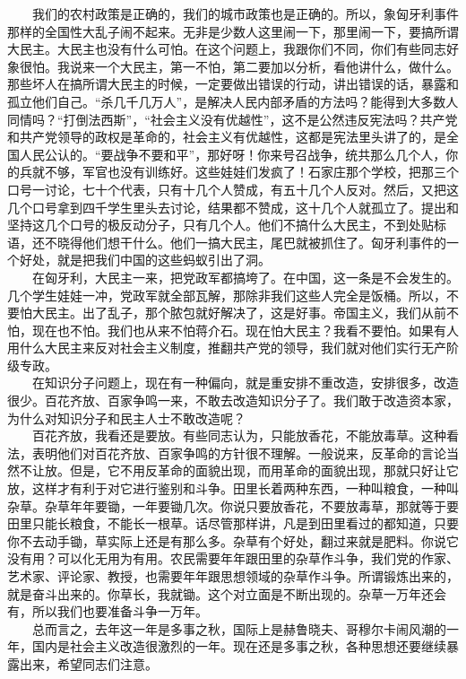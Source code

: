 \documentclass[cn,11pt,chinese]{elegantbook}
\begin{document}
　　我们的农村政策是正确的，我们的城市政策也是正确的。所以，象匈牙利事件那样的全国性大乱子闹不起来。无非是少数人这里闹一下，那里闹一下，要搞所谓大民主。大民主也没有什么可怕。在这个问题上，我跟你们不同，你们有些同志好象很怕。我说来一个大民主，第一不怕，第二要加以分析，看他讲什么，做什么。那些坏人在搞所谓大民主的时候，一定要做出错误的行动，讲出错误的话，暴露和孤立他们自己。“杀几千几万人”，是解决人民内部矛盾的方法吗？能得到大多数人同情吗？“打倒法西斯”，“社会主义没有优越性”，这不是公然违反宪法吗？共产党和共产党领导的政权是革命的，社会主义有优越性，这都是宪法里头讲了的，是全国人民公认的。“要战争不要和平”，那好呀！你来号召战争，统共那么几个人，你的兵就不够，军官也没有训练好。这些娃娃们发疯了！石家庄那个学校，把那三个口号一讨论，七十个代表，只有十几个人赞成，有五十几个人反对。然后，又把这几个口号拿到四千学生里头去讨论，结果都不赞成，这十几个人就孤立了。提出和坚持这几个口号的极反动分子，只有几个人。他们不搞什么大民主，不到处贴标语，还不晓得他们想干什么。他们一搞大民主，尾巴就被抓住了。匈牙利事件的一个好处，就是把我们中国的这些蚂蚁引出了洞。\\
　　在匈牙利，大民主一来，把党政军都搞垮了。在中国，这一条是不会发生的。几个学生娃娃一冲，党政军就全部瓦解，那除非我们这些人完全是饭桶。所以，不要怕大民主。出了乱子，那个脓包就好解决了，这是好事。帝国主义，我们从前不怕，现在也不怕。我们也从来不怕蒋介石。现在怕大民主？我看不要怕。如果有人用什么大民主来反对社会主义制度，推翻共产党的领导，我们就对他们实行无产阶级专政。\\
　　在知识分子问题上，现在有一种偏向，就是重安排不重改造，安排很多，改造很少。百花齐放、百家争鸣一来，不敢去改造知识分子了。我们敢于改造资本家，为什么对知识分子和民主人士不敢改造呢？\\
　　百花齐放，我看还是要放。有些同志认为，只能放香花，不能放毒草。这种看法，表明他们对百花齐放、百家争鸣的方针很不理解。一般说来，反革命的言论当然不让放。但是，它不用反革命的面貌出现，而用革命的面貌出现，那就只好让它放，这样才有利于对它进行鉴别和斗争。田里长着两种东西，一种叫粮食，一种叫杂草。杂草年年要锄，一年要锄几次。你说只要放香花，不要放毒草，那就等于要田里只能长粮食，不能长一根草。话尽管那样讲，凡是到田里看过的都知道，只要你不去动手锄，草实际上还是有那么多。杂草有个好处，翻过来就是肥料。你说它没有用？可以化无用为有用。农民需要年年跟田里的杂草作斗争，我们党的作家、艺术家、评论家、教授，也需要年年跟思想领域的杂草作斗争。所谓锻炼出来的，就是奋斗出来的。你草长，我就锄。这个对立面是不断出现的。杂草一万年还会有，所以我们也要准备斗争一万年。\\
　　总而言之，去年这一年是多事之秋，国际上是赫鲁晓夫、哥穆尔卡闹风潮的一年，国内是社会主义改造很激烈的一年。现在还是多事之秋，各种思想还要继续暴露出来，希望同志们注意。\\
\end{document}
